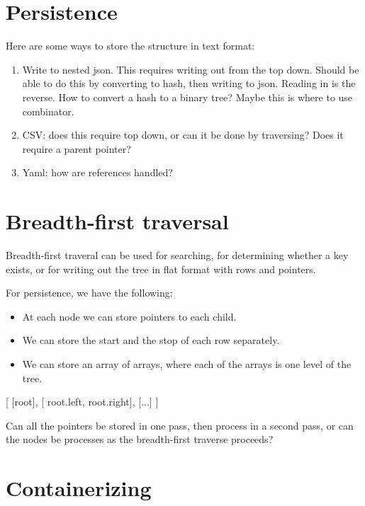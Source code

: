 \documentclass{article}
\begin{document}
\section{Persistence}

Here are some ways to store the structure in text format:

\begin{enumerate}
\item Write to nested json. This requires writing out from the top
down. Should be able to do this by converting to hash, then
writing to json. Reading in is the reverse. How to convert a
hash to a binary tree? Maybe this is where to use combinator.

\item CSV: does this require top down, or can it be done by traversing?
Does it require a parent pointer?

\item Yaml: how are references handled?
\end{enumerate}


\section{Breadth-first traversal}

Breadth-first traveral can be used for searching, for determining whether a key exists,
or for writing out the tree in flat format with rows and pointers.

For persistence, we have the following:

\begin{itemize}
\item At each node we can store pointers to each child.
\item We can store the start and the stop of each row separately.
\item We can store an array of arrays, where each of the arrays is
      one level of the tree.
\end{itemize}

[
 [root],
 [ root.left, root.right],
 [...]
]

Can all the pointers be stored in one pass, then process in a second pass,
or can the nodes be processes as the breadth-first traverse proceeds?



\section{Containerizing}
\end{document}
